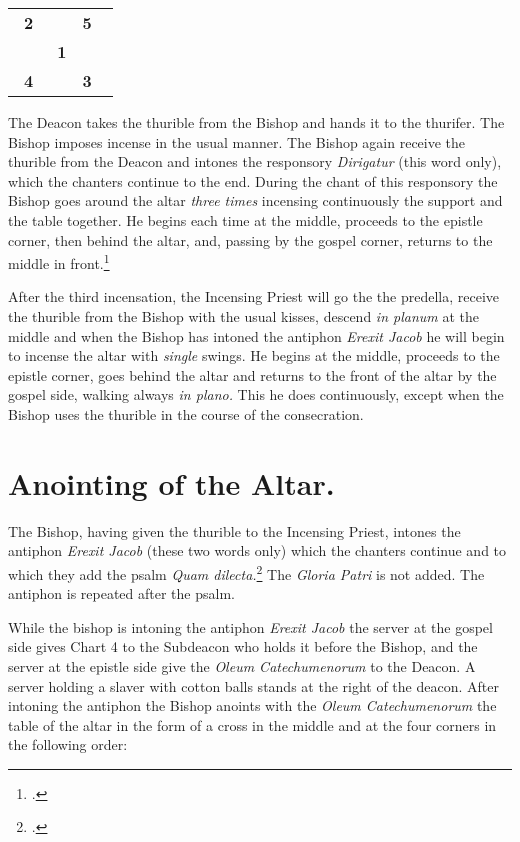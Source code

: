 \documentclass[letterpaper]{report}
\newcommand\crossplan{
\begin{center}
    \begin{tabular}{ | l c r | }
       \hline
       \cross\ \textbf{2} &                    & \textbf{5} \cross\ \\
                          & \cross\ \textbf{1} &                    \\
       \cross\ \textbf{4} &                    & \textbf{3} \cross\ \\
       \hline
   \end{tabular} 
\end{center}
}
\begin{document}
{\crossplan

\rubric The Deacon takes the thurible from the Bishop and hands it to the
thurifer. The Bishop imposes incense in the usual manner. The Bishop again
receive the thurible from the Deacon and intones the responsory
\textit{Dirigatur} (this word only), which the chanters continue to the end.
During the chant of this responsory the Bishop goes around the altar
\textit{three times} incensing continuously the support and the table together.
He begins each time at the middle, proceeds to the epistle corner, then behind
the altar, and, passing by the gospel corner, returns to the middle in
front.\footcite[If the back of the altar is attached to the wall, he begins at
the middle, incenses the support as fas as the epistle corner, afterwards the
table from the epistle to the gospel side, then the side of the altar at the
gospel side, then the side of the altar at the gospel corner and finally the
support from the gospel corner to the middle.][footnote 1, p. 96.]{consecranda}

\rubric After the third incensation, the Incensing Priest will go the the
predella, receive the thurible from the Bishop with the usual kisses, descend
\textit{in planum} at the middle and when the Bishop has intoned the antiphon
\textit{Erexit Jacob} he will begin to incense the altar with \textit{single}
swings. He begins at the middle, proceeds to the epistle corner, goes behind
the altar and returns to the front of the altar by the gospel side, walking
always \textit{in plano.} This he does continuously, except when the Bishop
uses the thurible in the course of the consecration.

\section{Anointing of the Altar.}

\rubric The Bishop, having given the thurible to the Incensing Priest, intones
the antiphon \textit{Erexit Jacob} (these two words only) which the chanters
continue and to which they add the psalm \textit{Quam dilecta.}\footcite[The
rubric appplied to psalm 42 above applied here as well.]{consecranda} The
\textit{Gloria Patri} is not added. The antiphon is repeated after the psalm.

\rubric While the bishop is intoning the antiphon \textit{Erexit Jacob} the
server at the gospel side gives Chart 4 to the Subdeacon who holds it before
the Bishop, and the server at the epistle side give the \textit{Oleum
Catechumenorum} to the Deacon. A server holding a slaver with cotton balls
stands at the right of the deacon. After intoning the antiphon the Bishop
anoints with the \textit{Oleum Catechumenorum} the table of the altar in the
form of a cross in the middle and at the four corners in the following order:

}
\end{document}
